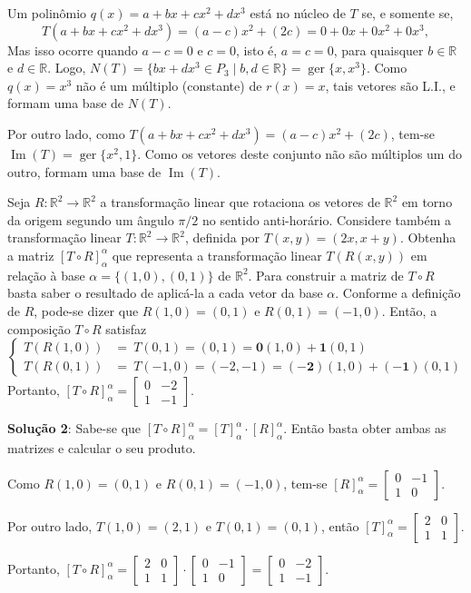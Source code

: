 \documentclass[12pt,a4paper]{article}
\newcommand*\R{\mathbb{R}}
\begin{document}
\begin{ExerciseList}
Um polinômio $q(x) = a+bx+cx^2+dx^3$ está no núcleo de $T$ se, e somente se,
\[
T(a+bx+cx^2+dx^3) = (a-c)x^2+(2c) = 0+0x+0x^2+0x^3,
\]
Mas isso ocorre quando $a-c = 0$ e $c=0$, isto é, $a=c=0$, para quaisquer $b\in \R$ e $d\in \R$. Logo,
$N(T) = \{ bx+dx^3 \in P_3 \mid b,d \in \R \}
= \operatorname{ger}\{x, x^3\}$. Como $q(x) = x^3$ não é um múltiplo (constante) de $r(x) = x$, tais vetores são L.I., e formam uma base de $N(T)$.

Por outro lado, como $T(a+bx+cx^2+dx^3) = (a-c)x^2+(2c)$, tem-se $\operatorname{Im}(T) = \operatorname{ger}\{ x^2, 1 \}$. Como os vetores deste conjunto não são múltiplos um do outro, formam uma base de $\operatorname{Im}(T)$.


\Exercise[title={2,5}] Seja $R: \R^2 \to \R^2$ a transformação linear que rotaciona os vetores de $\R^2$ em torno da origem segundo um ângulo $\pi/2$ no sentido anti-horário. Considere também a transformação linear $T: \R^2 \to \R^2$, definida por $T(x,y) = (2x,x+y)$. Obtenha a matriz $[ T \circ R ]_\alpha^\alpha$ que representa a transformação linear $T(R(x,y))$ em relação à base $\alpha = \{ (1,0), (0,1) \}$ de $\R^2$.
\Answer Para construir a matriz de $T \circ R$ basta saber o resultado de aplicá-la a cada vetor da base $\alpha$. Conforme a definição de $R$, pode-se dizer que $R(1,0) = (0,1)$ e $R(0,1)=(-1,0)$. Então, a composição $T \circ R$ satisfaz
\[
\begin{cases}
T(R(1,0)) & =\ T(0,1) = (0,1) = \mathbf{0}(1,0) + \mathbf{1}(0,1)\\
T(R(0,1)) & =\ T(-1,0) = (-2,-1) = \mathbf{(-2)}(1,0) + \mathbf{(-1)}(0,1)
\end{cases}
\]
Portanto,
$[ T \circ R ]_\alpha^\alpha
=
\begin{bmatrix}
0 & -2\\
1	 & -1
\end{bmatrix}$.

\textbf{Solução 2}: Sabe-se que
$[ T \circ R ]_\alpha^\alpha
=[ T ]_\alpha^\alpha \cdot [ R ]_\alpha^\alpha$. Então basta obter ambas as matrizes e calcular o seu produto.

Como $R(1,0) = (0,1)$ e $R(0,1)=(-1,0)$, tem-se
$[ R ]_\alpha^\alpha
=
\begin{bmatrix}
0 & -1\\
1 &  0
\end{bmatrix}$.

Por outro lado, $T(1,0) = (2,1)$ e $T(0,1)=(0,1)$, então $[ T ]_\alpha^\alpha
=
\begin{bmatrix}
2 & 0\\
1 & 1
\end{bmatrix}$.

Portanto,
$
[ T \circ R ]_\alpha^\alpha =
\begin{bmatrix}
2 & 0\\
1 & 1
\end{bmatrix}
\cdot
\begin{bmatrix}
0 & -1\\
1 &  0
\end{bmatrix}
=
\begin{bmatrix}
0 & -2\\
1 & -1
\end{bmatrix}$.
\end{ExerciseList}
\end{document}
